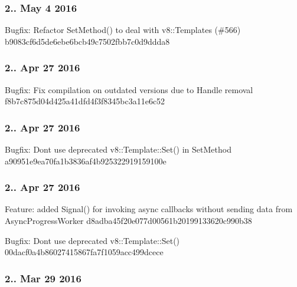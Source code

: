 \subsubsection*{2.. May 4 2016}


\begin{DoxyItemize}
\item Bugfix\+: Refactor Set\+Method() to deal with v8\+::\+Templates (\#566) b9083cf6d5de6ebe6bcb49c7502fbb7c0d9ddda8
\end{DoxyItemize}

\subsubsection*{2.. Apr 27 2016}


\begin{DoxyItemize}
\item Bugfix\+: Fix compilation on outdated versions due to Handle removal f8b7c875d04d425a41dfd4f3f8345bc3a11e6c52
\end{DoxyItemize}

\subsubsection*{2.. Apr 27 2016}


\begin{DoxyItemize}
\item Bugfix\+: Don\textquotesingle{}t use deprecated v8\+::\+Template\+::\+Set() in Set\+Method a90951e9ea70fa1b3836af4b925322919159100e
\end{DoxyItemize}

\subsubsection*{2.. Apr 27 2016}


\begin{DoxyItemize}
\item Feature\+: added Signal() for invoking async callbacks without sending data from Async\+Progress\+Worker d8adba45f20e077d00561b20199133620c990b38
\item Bugfix\+: Don\textquotesingle{}t use deprecated v8\+::\+Template\+::\+Set() 00dacf0a4b86027415867fa7f1059acc499dcece
\end{DoxyItemize}

\subsubsection*{2.. Mar 29 2016}



